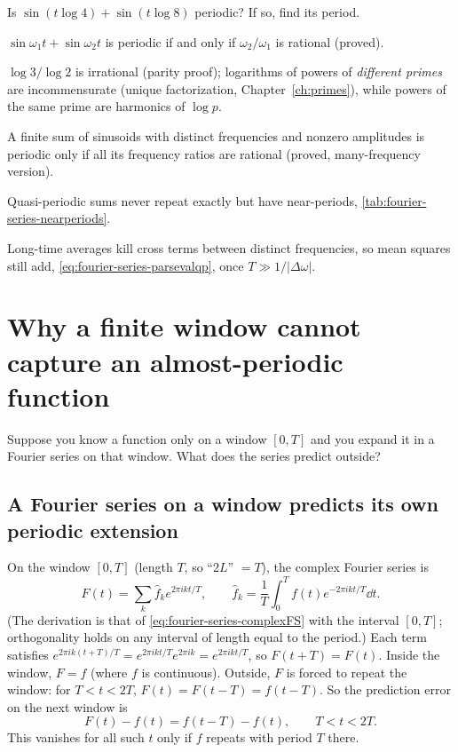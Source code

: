 \begin{checkpoint}
Is $\sin(t\log4)+\sin(t\log8)$ periodic? If so, find its period.
\end{checkpoint}

\begin{keyideas}
\item $\sin\omega_1t+\sin\omega_2t$ is periodic if and only if $\omega_2/\omega_1$ is rational (proved).
\item $\log3/\log2$ is irrational (parity proof); logarithms of powers of \emph{different primes} are incommensurate (unique factorization, Chapter~\ref{ch:primes}), while powers of the same prime are harmonics of $\log p$.
\item A finite sum of sinusoids with distinct frequencies and nonzero amplitudes is periodic only if all its frequency ratios are rational (proved, many-frequency version).
\item Quasi-periodic sums never repeat exactly but have near-periods, \cref{tab:fourier-series-nearperiods}.
\item Long-time averages kill cross terms between distinct frequencies, so mean squares still add, \cref{eq:fourier-series-parsevalqp}, once $T\gg1/|\Delta\omega|$.
\end{keyideas}

\section{Why a finite window cannot capture an almost-periodic function}\label{sec:fourier-series-window}

Suppose you know a function only on a window $[0,T]$ and you expand it in a Fourier series on that window. What does the series predict outside?

\subsection{A Fourier series on a window predicts its own periodic extension}

On the window $[0,T]$ (length $T$, so ``$2L$'' $=T$), the complex Fourier series is
\begin{equation}
F(t)=\sum_k\hat f_ke^{2\pi ikt/T},\qquad \hat f_k=\frac1T\int_0^Tf(t)e^{-2\pi ikt/T}\dd t .
\label{eq:fourier-series-windowFS}
\end{equation}
(The derivation is that of \cref{eq:fourier-series-complexFS} with the interval $[0,T]$; orthogonality holds on any interval of length equal to the period.) Each term satisfies $e^{2\pi ik(t+T)/T}=e^{2\pi ikt/T}e^{2\pi ik}=e^{2\pi ikt/T}$, so $F(t+T)=F(t)$. Inside the window, $F=f$ (where $f$ is continuous). Outside, $F$ is forced to repeat the window: for $T<t<2T$, $F(t)=F(t-T)=f(t-T)$. So the prediction error on the next window is
\begin{equation}
F(t)-f(t)=f(t-T)-f(t),\qquad T<t<2T.
\label{eq:fourier-series-extensionerror}
\end{equation}
This vanishes for all such $t$ only if $f$ repeats with period $T$ there.

